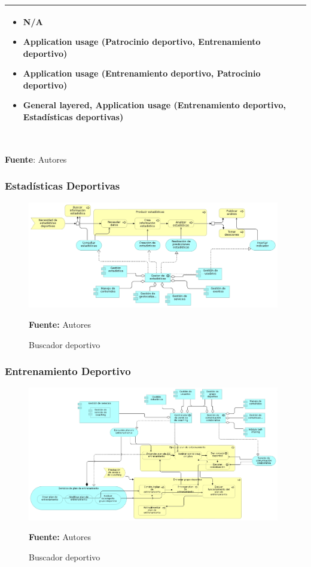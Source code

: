 \begin{table}[!htb]
\begin{center}
{\begin{tabular}{|p{7cm}|p{4cm}|}
\begin{itemize}
				\item N/A
				\item Application usage (Patrocinio deportivo, Entrenamiento deportivo)
				\item Application usage (Entrenamiento deportivo, Patrocinio deportivo)
				\item General layered, Application usage (Entrenamiento deportivo, Estadísticas deportivas)
			\end{itemize}
			\\
			\hline
		\end{tabular}
		} \\
		\textbf{Fuente}: Autores
	\end{center}
\end{table}

\subsubsection{Estadísticas Deportivas}

\begin{figure}[!htb]
  \begin{center}
    \includegraphics[width=11cm]{./imagenes/application_usage/estadisticasdeportivas.png}
    \caption{Buscador deportivo}
    \label{fig:BF_BuscadorDeportivo}
    \textbf{Fuente:}  Autores
  \end{center}
\end{figure}

\subsubsection{Entrenamiento Deportivo}

\begin{figure}[!htb]
  \begin{center}
    \includegraphics[width=11cm]{./imagenes/application_usage/entrenamientodeportivo.png}
    \caption{Buscador deportivo}
    \label{fig:BF_BuscadorDeportivo}
    \textbf{Fuente:}  Autores
  \end{center}
\end{figure}

